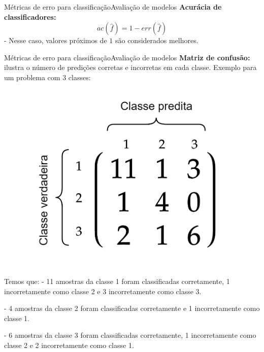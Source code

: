 \documentclass[t]{beamer}
\begin{document}

\begin{ftst}{Métricas de erro para classificação}{Avaliação de modelos}
\justifying
\textbf{Acurácia de classificadores:}
\begin{equation}
    ac(\hat{f}) = 1 - err(\hat{f})
\end{equation}
\vone
- Nesse caso, valores próximos de $1$ são considerados melhores.


\end{ftst}


\begin{ftst}{Métricas de erro para classificação}{Avaliação de modelos}
\justifying
\small
\textbf{Matriz de confusão:} ilustra o número de predições corretas e incorretas em cada classe. Exemplo para um problema com 3 classes:
\begin{figure}
    \includegraphics[scale=0.13]{Figuras/slide04_01.png}
\end{figure}
\scriptsize
Temos que:
\vone
- 11 amostras da classe 1 foram classificadas corretamente, 1 incorretamente como classe 2 e 3 incorretamente como classe 3.

- 4 amostras da classe 2 foram classificadas corretamente e 1 incorretamente como classe 1. 

- 6 amostras da classe 3 foram classificadas corretamente, 1 incorretamente como classe 2 e 2 incorretamente como classe 1.

\end{ftst}
\end{document}
